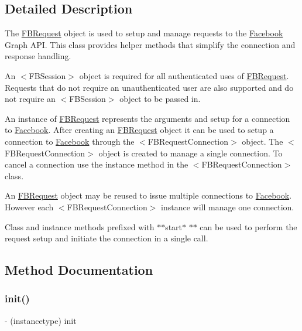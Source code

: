 \subsection{Detailed Description}
The {\ttfamily \hyperlink{interfaceFBRequest}{F\+B\+Request}} object is used to setup and manage requests to the \hyperlink{interfaceFacebook}{Facebook} Graph A\+PI. This class provides helper methods that simplify the connection and response handling.

An $<$\+F\+B\+Session$>$ object is required for all authenticated uses of {\ttfamily \hyperlink{interfaceFBRequest}{F\+B\+Request}}. Requests that do not require an unauthenticated user are also supported and do not require an $<$\+F\+B\+Session$>$ object to be passed in.

An instance of {\ttfamily \hyperlink{interfaceFBRequest}{F\+B\+Request}} represents the arguments and setup for a connection to \hyperlink{interfaceFacebook}{Facebook}. After creating an {\ttfamily \hyperlink{interfaceFBRequest}{F\+B\+Request}} object it can be used to setup a connection to \hyperlink{interfaceFacebook}{Facebook} through the $<$\+F\+B\+Request\+Connection$>$ object. The $<$\+F\+B\+Request\+Connection$>$ object is created to manage a single connection. To cancel a connection use the instance method in the $<$\+F\+B\+Request\+Connection$>$ class.

An {\ttfamily \hyperlink{interfaceFBRequest}{F\+B\+Request}} object may be reused to issue multiple connections to \hyperlink{interfaceFacebook}{Facebook}. However each $<$\+F\+B\+Request\+Connection$>$ instance will manage one connection.

Class and instance methods prefixed with $\ast$$\ast$start$\ast$ $\ast$$\ast$ can be used to perform the request setup and initiate the connection in a single call. 

\subsection{Method Documentation}
\mbox{\label{interfaceFBRequest_a9e753030844abe92959a169b508f0a2b}} 
\subsubsection{\texorpdfstring{init()}{init()}\hspace{0.1cm}{\footnotesize\ttfamily [1/5]}}
{\footnotesize\ttfamily -\/ (instancetype) init \begin{DoxyParamCaption}{ }\end{DoxyParamCaption}}

